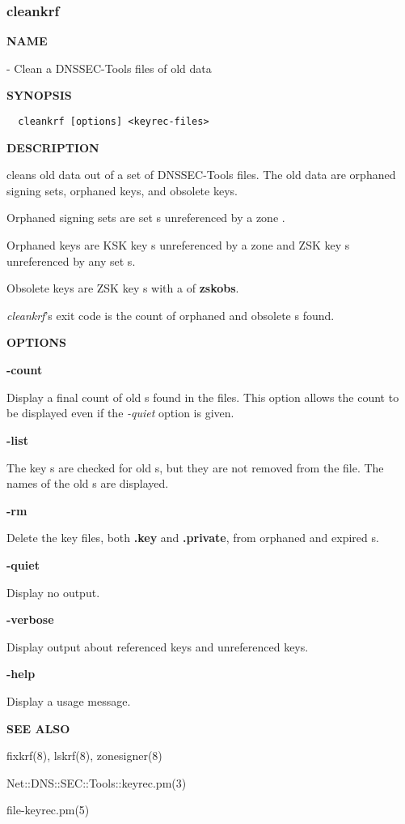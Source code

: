 \clearpage

\subsubsection{cleankrf}

{\bf NAME}

 - Clean a DNSSEC-Tools  files of old data

{\bf SYNOPSIS}

\begin{verbatim}
  cleankrf [options] <keyrec-files>
\end{verbatim}

{\bf DESCRIPTION}

 cleans old data out of a set of DNSSEC-Tools 
files.  The old data are orphaned signing sets, orphaned keys, and obsolete
keys.

Orphaned signing sets are set s unreferenced by a zone
.

Orphaned keys are KSK key s unreferenced by a zone
 and ZSK key s unreferenced by any set
s.

Obsolete keys are ZSK key s with a  of
{\bf zskobs}.

{\it cleankrf}'s exit code is the count of orphaned and obsolete
s found.

{\bf OPTIONS}

\begin{description}

\item {\bf -count}\verb" "

Display a final count of old s found in the 
files.  This option allows the count to be displayed even if the {\it -quiet}
option is given.

\item {\bf -list}\verb" "

The key s are checked for old s, but they are
not removed from the  file.  The names of the old
s are displayed.

\item {\bf -rm}\verb" "

Delete the key files, both {\bf .key} and {\bf .private}, from orphaned and
expired s.

\item {\bf -quiet}\verb" "

Display no output.

\item {\bf -verbose}\verb" "

Display output about referenced keys and unreferenced keys.

\item {\bf -help}\verb" "

Display a usage message.

\end{description}

{\bf SEE ALSO}

fixkrf(8),
lskrf(8),
zonesigner(8)

Net::DNS::SEC::Tools::keyrec.pm(3)

file-keyrec.pm(5)

